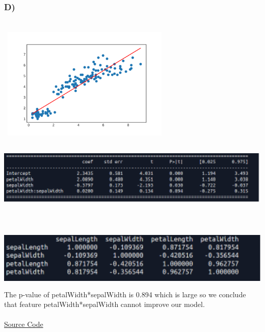 \documentclass[12pt]{article}
\begin{document}
\subsubsection{D)}\
\includegraphics[width=8cm, height=6.5cm]{LR_mul}\\
\includegraphics[width=15cm, height=3cm]{E}\\\\\\
\includegraphics[width=15cm, height=3cm]{ss9}\\
The p-value of petalWidth*sepalWidth is 0.894 which is large so we conclude that feature petalWidth*sepalWidth cannot improve our model.\\\\
\href{https://github.com/zamaniali1995/Linear-Regressions-and-Linear-Models-using-the-Iris-Data}{Source Code}
\end{document}
